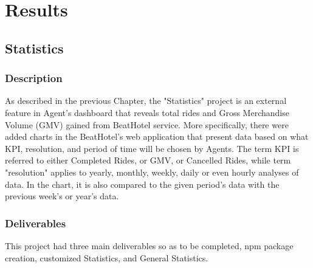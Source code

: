 
\chapter{Results} %

\label{Chapter4}

\section{Statistics}

\subsection{Description}
As described in the previous Chapter, the "Statistics" project is an external feature in Agent's dashboard that reveals total rides and Gross Merchandise Volume (GMV) gained from BeatHotel service. More specifically, there were added charts in the BeatHotel's web application that present data based on what KPI, resolution, and period of time will be chosen by Agents. The term KPI is referred to either Completed Rides, or GMV, or Cancelled Rides, while term "resolution" applies to yearly, monthly, weekly, daily or even hourly analyses of data. In the chart, it is also compared to the given period's data with the previous week's or year's data. \par

\subsection{Deliverables}
This project had three main deliverables so as to be completed, npm package creation, customized Statistics, and General Statistics. \par

